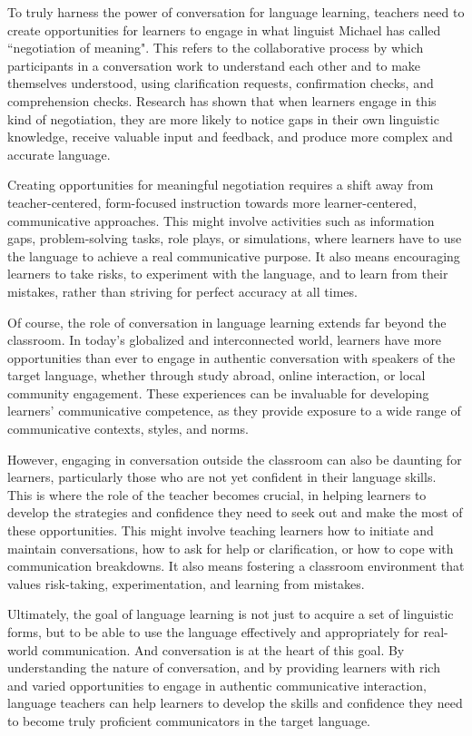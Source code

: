 To truly harness the power of conversation for language learning, teachers need to create opportunities for learners to engage in what linguist Michael \citet{long1983} has called ``negotiation of meaning". This refers to the collaborative process by which participants in a conversation work to understand each other and to make themselves understood, using clarification requests, confirmation checks, and comprehension checks. Research has shown that when learners engage in this kind of negotiation, they are more likely to notice gaps in their own linguistic knowledge, receive valuable input and feedback, and produce more complex and accurate language.

Creating opportunities for meaningful negotiation requires a shift away from teacher-centered, form-focused instruction towards more learner-centered, communicative approaches. This might involve activities such as information gaps, problem-solving tasks, role plays, or simulations, where learners have to use the language to achieve a real communicative purpose. It also means encouraging learners to take risks, to experiment with the language, and to learn from their mistakes, rather than striving for perfect accuracy at all times.

Of course, the role of conversation in language learning extends far beyond the classroom. In today's globalized and interconnected world, learners have more opportunities than ever to engage in authentic conversation with speakers of the target language, whether through study abroad, online interaction, or local community engagement. These experiences can be invaluable for developing learners' communicative competence, as they provide exposure to a wide range of communicative contexts, styles, and norms.

However, engaging in conversation outside the classroom can also be daunting for learners, particularly those who are not yet confident in their language skills. This is where the role of the teacher becomes crucial, in helping learners to develop the strategies and confidence they need to seek out and make the most of these opportunities. This might involve teaching learners how to initiate and maintain conversations, how to ask for help or clarification, or how to cope with communication breakdowns. It also means fostering a classroom environment that values risk-taking, experimentation, and learning from mistakes.

Ultimately, the goal of language learning is not just to acquire a set of linguistic forms, but to be able to use the language effectively and appropriately for real-world communication. And conversation is at the heart of this goal. By understanding the nature of conversation, and by providing learners with rich and varied opportunities to engage in authentic communicative interaction, language teachers can help learners to develop the skills and confidence they need to become truly proficient communicators in the target language.

